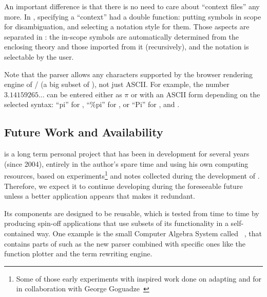 An important difference is that there is no need to care about ``context files'' any more.
In {\qmath}, specifying a ``context'' had a double function: putting
symbols in scope for disambiguation, and selecting a notation style for them.
Those aspects are separated in {\sentido}:
the in-scope symbols are automatically determined from
the enclosing theory and those imported from it (recursively),
and the notation is selectable by the user.

Note that the parser allows any characters supported by the browser
rendering engine of {\mozilla}/{\firefox} (a big subset of {\unicode}),
not just ASCII. For example, the number $3.14159265...$ can be entered either
as $\pi$ or with an ASCII form depending on the selected syntax:
``pi'' for {\qmath}, ``\%pi'' for {\maxima},
or ``Pi'' for {\yacas}, {\maple} and {\mathematica}.


\subsection{Future Work and Availability}

{\sentido} is a long term personal project
that has been in development for several years (since 2004),
entirely in the author's spare time and using his own computing resources,
based on experiments\footnote{Some of those early experiments with {\mozilla}
inspired work done on adapting {\openoffice} and {\texmacs} for {\omdoc}
in collaboration with George Goguadze~\cite{GogPal:amesam03}}
and notes collected during the development of {\qmath}.
Therefore, we expect it to continue developing during the foreseeable future
unless a better application appears that makes it redundant.

Its components are designed to be reusable, which is tested from time to time by producing
spin-off applications that use subsets of its functionality in a self-contained way. One
example is the small Computer Algebra System called {\algebra}~\cite{algebra:URL}, that
contains parts of {\sentido} such as the new parser combined with specific ones like the
function plotter and the term rewriting engine.

